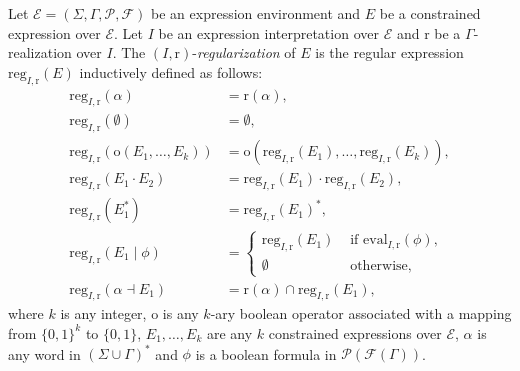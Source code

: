 \documentclass[a4paper]{llncs}
\begin{document}
  \begin{definition}[Regularization]\label{def i r reg exp}
    Let $\mathcal{E}=(\Sigma,\Gamma,\mathcal{P},\mathcal{F})$ be an expression environment and $E$ be a constrained expression over $\mathcal{E}$. Let $I$ be an expression interpretation over $\mathcal{E}$ and $\mathrm{r}$ be a $\Gamma$-realization over $I$. The $(I,\mathrm{r})$-\emph{regularization} of $E$ is the regular expression $\mathrm{reg}_{I,\mathrm{r}}(E)$ inductively defined as follows:
    \begin{align*}
      \mathrm{reg}_{I,\mathrm{r}}(\alpha)&=\mathrm{r}(\alpha),\\
      \mathrm{reg}_{I,\mathrm{r}}(\emptyset)&=\emptyset,\\
      \mathrm{reg}_{I,\mathrm{r}}(\mathrm{o}(E_1,\ldots,E_k))&=\mathrm{o}(\mathrm{reg}_{I,\mathrm{r}}(E_1),\ldots,\mathrm{reg}_{I,\mathrm{r}}(E_k)),\\
      \mathrm{reg}_{I,\mathrm{r}}(E_1\cdot E_2)&=\mathrm{reg}_{I,\mathrm{r}}(E_1)\cdot \mathrm{reg}_{I,\mathrm{r}}(E_2),\\
      \mathrm{reg}_{I,\mathrm{r}}(E_1^*)&=\mathrm{reg}_{I,\mathrm{r}}(E_1)^*,\\
      \mathrm{reg}_{I,\mathrm{r}}(E_1\mid\phi)&=
        \begin{cases}
             \mathrm{reg}_{I,\mathrm{r}}(E_1) & \text{ if } \mathrm{eval}_{I,\mathrm{r}}(\phi),\\
             \emptyset & \text{ otherwise,}
        \end{cases}\\
      \mathrm{reg}_{I,\mathrm{r}}(\alpha \dashv E_1)&= \mathrm{r}(\alpha) \cap \mathrm{reg}_{I,\mathrm{r}}(E_1),
    \end{align*}
    where $k$ is any integer, $\mathrm{o}$ is any $k$-ary boolean operator associated with a mapping from $\{0,1\}^k$ to $\{0,1\}$, $E_1,\ldots,E_k$ are any $k$ constrained expressions over $\mathcal{E}$, $\alpha$ is any word in $(\Sigma\cup \Gamma)^*$ and $\phi$ is a boolean formula in $\mathcal{P}(\mathcal{F}(\Gamma))$.  
  \end{definition}
  
\end{document}
